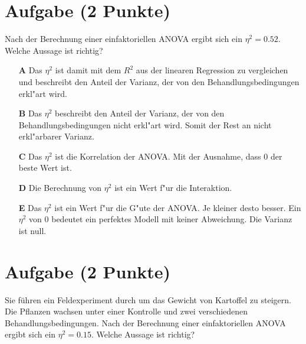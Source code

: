 \documentclass[a4paper, 9pt]{scrartcl}\usepackage[]{graphicx}\usepackage[]{xcolor}
\begin{document}
\section{Aufgabe \hfill (2 Punkte)}





Nach der Berechnung einer einfaktoriellen ANOVA ergibt sich ein $\eta^2 = 0.52$. Welche Aussage ist richtig?



\begin{enumerate}
\item [\textbf{A} \msquare] Das $\eta^2$ ist damit mit dem $R^2$ aus der linearen Regression zu vergleichen und beschreibt den Anteil der Varianz, der von den Behandlungsbedingungen erkl{"a}rt wird.
\item [\textbf{B} \msquare] Das $\eta^2$ beschreibt den Anteil der Varianz, der von den Behandlungsbedingungen nicht erkl{"a}rt wird. Somit der Rest an nicht erkl{"a}rbarer Varianz.
\item [\textbf{C} \msquare] Das $\eta^2$ ist die Korrelation der ANOVA. Mit der Ausnahme, dass 0 der beste Wert ist.
\item [\textbf{D} \msquare] Die Berechnung von $\eta^2$ ist ein Wert f{"u}r die Interaktion.
\item [\textbf{E} \msquare] Das $\eta^2$ ist ein Wert f{"u}r die G{"u}te der ANOVA. Je kleiner desto besser. Ein $\eta^2$ von 0 bedeutet ein perfektes Modell mit keiner Abweichung. Die Varianz ist null.
\end{enumerate} 

\section{Aufgabe \hfill (2 Punkte)}



Sie führen ein Feldexperiment durch um das Gewicht von Kartoffel zu
steigern. Die Pflanzen wachsen unter einer Kontrolle und zwei verschiedenen
Behandlungsbedingungen. Nach der Berechnung einer einfaktoriellen ANOVA
ergibt sich ein $\eta^2 = 0.15$. Welche Aussage ist richtig?
\end{document}
